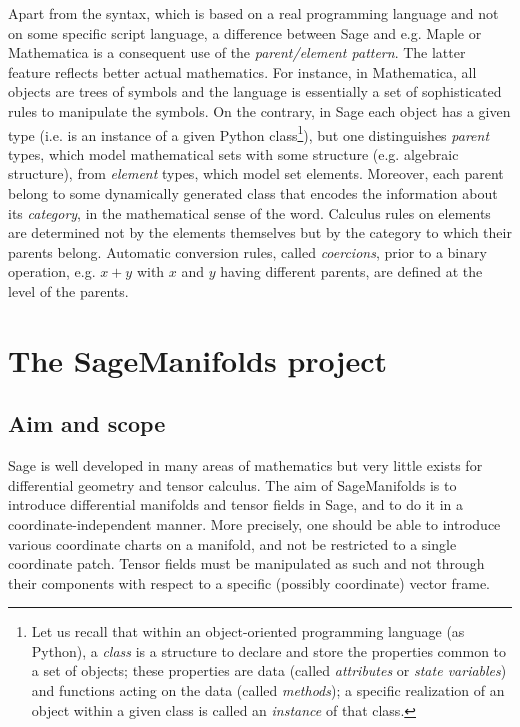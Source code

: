 \documentclass[a4paper]{jpconf}
\newcommand{\soft}[1]{\textsf{#1}}
\newcommand{\Sage}{\soft{Sage}}
\newcommand{\SM}{\soft{SageManifolds}}
\begin{document}
Apart from the syntax, which is based on a real programming language and not on some specific script 
language, a difference between \Sage{} and e.g. \soft{Maple} or \soft{Mathematica}
is a consequent use of the \emph{parent/element pattern}. The latter  
feature reflects better actual mathematics. 
For instance, in \soft{Mathematica}, all objects 
are trees of symbols and the language is essentially a set of 
sophisticated rules to manipulate the symbols. On the contrary, in \Sage{}
each object has a given type (i.e. is an instance of a given
Python class\footnote{Let us
recall that within an object-oriented programming language (as Python),
a \emph{class} is a structure to declare and store the
properties common to a set of objects; these properties 
are data (called 
\emph{attributes} or \emph{state variables}) and functions acting 
on the data (called \emph{methods}); a specific realization of an object 
within a given class is called an \emph{instance} of that class.}), 
but one distinguishes \emph{parent} types, which model mathematical
sets with some structure (e.g. algebraic structure), from \emph{element} types,
which model set elements. Moreover, each parent belong to some 
dynamically generated class that encodes the information 
about its \emph{category}, in the mathematical sense of the word.
Calculus rules on elements are determined not by the elements themselves
but by the category to which their parents belong. Automatic conversion rules, called \emph{coercions},
prior to a binary operation, e.g. $x+y$ with $x$ and $y$ having different 
parents, are defined at the level of the parents.


\section{The SageManifolds project}

\subsection{Aim and scope}

\Sage{} is well developed in many areas of mathematics but 
very little exists for differential geometry and tensor calculus.
The aim of \SM{} \cite{SM} is to introduce differential manifolds and tensor fields
in \Sage{}, and to do it in a coordinate-independent manner. 
More precisely, one should be able to introduce various coordinate charts
on a manifold, and not be restricted to a single coordinate patch. 
Tensor fields must be manipulated as such and not through 
their components with respect to a specific (possibly coordinate) vector frame. 
\end{document}
